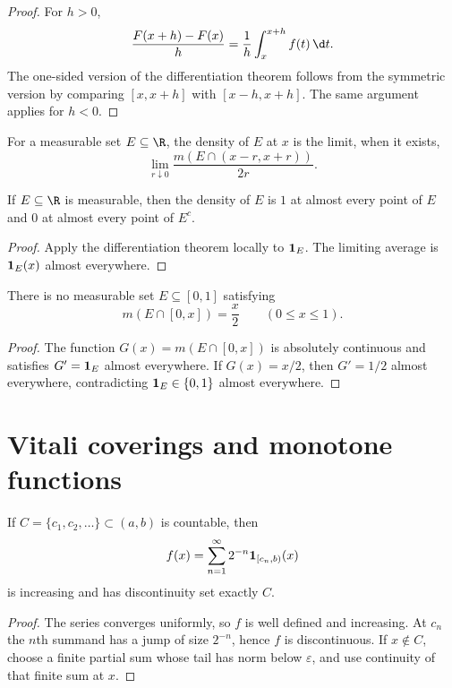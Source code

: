 \begin{proof}
For $h>0$,
\[
\frac{F(x+h)-F(x)}h=\frac1h\int_x^{x+h}f(t)\,\d t.
\]
The one-sided version of the differentiation theorem follows from the symmetric version by comparing $[x,x+h]$ with $[x-h,x+h]$. The same argument applies for $h<0$.
\end{proof}

\begin{de}[Density]
For a measurable set $E\subseteq\R$, the density of $E$ at $x$ is the limit, when it exists,
\[
\lim_{r\downarrow0}\frac{m(E\cap(x-r,x+r))}{2r}.
\]
\end{de}

\begin{thm}
If $E\subseteq\R$ is measurable, then the density of $E$ is $1$ at almost every point of $E$ and $0$ at almost every point of $E^c$.
\end{thm}

\begin{proof}
Apply the differentiation theorem locally to $\mathbf{1}_E$. The limiting average is $\mathbf{1}_E(x)$ almost everywhere.
\end{proof}

\begin{exercise}
There is no measurable set $E\subseteq[0,1]$ satisfying
\[
m(E\cap[0,x])=\frac{x}{2}\qquad(0\leq x\leq1).
\]
\end{exercise}

\begin{proof}
The function $G(x)=m(E\cap[0,x])$ is absolutely continuous and satisfies $G'=\mathbf{1}_E$ almost everywhere. If $G(x)=x/2$, then $G'=1/2$ almost everywhere, contradicting $\mathbf{1}_E\in\{0,1\}$ almost everywhere.
\end{proof}

\section{Vitali coverings and monotone functions}

\begin{prop}
If $C=\{c_1,c_2,\dots\}\subset(a,b)$ is countable, then
\[
f(x)=\sum_{n=1}^{\infty}2^{-n}\mathbf{1}_{[c_n,b)}(x)
\]
is increasing and has discontinuity set exactly $C$.
\end{prop}

\begin{proof}
The series converges uniformly, so $f$ is well defined and increasing. At $c_n$ the $n$th summand has a jump of size $2^{-n}$, hence $f$ is discontinuous. If $x\notin C$, choose a finite partial sum whose tail has norm below $\varepsilon$, and use continuity of that finite sum at $x$.
\end{proof}

